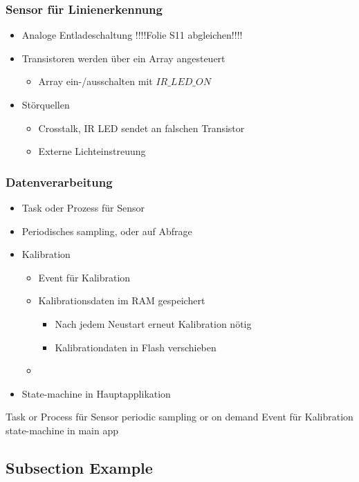 \documentclass{beamer}
\begin{document}
\begin{frame}
	\frametitle{Sensor für Linienerkennung}
	\begin{itemize}
		\item{Analoge Entladeschaltung !!!!Folie S11 abgleichen!!!!}
		\item{Transistoren werden über ein Array angesteuert}
		\begin{itemize}
			\item{Array ein-/ausschalten mit $IR\_LED\_ON$}
		\end{itemize}
	\end{itemize}
	\begin{itemize}
		\item{Störquellen}
		\begin{itemize}
			\item{Crosstalk, IR LED sendet an falschen Transistor}
			\item{Externe Lichteinstreuung}
		\end{itemize}
	\end{itemize}
\end{frame}

\begin{frame}
	\frametitle{Datenverarbeitung}
	\begin{itemize}
		\item{Task oder Prozess für Sensor}
		\item{Periodisches sampling, oder auf Abfrage}
		\item{Kalibration}
		\begin{itemize}
			\item{Event für Kalibration}
			\item{Kalibrationsdaten im RAM gespeichert}
			\begin{itemize}
				\item{Nach jedem Neustart erneut Kalibration nötig}
				\item{Kalibrationdaten in Flash verschieben}
			\end{itemize}
			\item{}
		\end{itemize}
		\item{State-machine in Hauptapplikation}
	\end{itemize}


	Task or Process für Sensor
	periodic sampling or on demand
	Event für Kalibration
	state-machine in main app
\end{frame}

\subsection{Subsection Example} %
\end{document}
